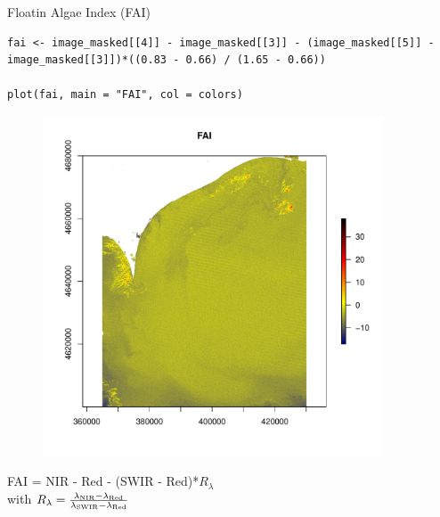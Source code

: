 \documentclass[10pt]{beamer}
\begin{document}
\begin{frame}[fragile]{Floatin Algae Index (FAI)}
\begin{lstlisting}[firstnumber = 49]
fai <- image_masked[[4]] - image_masked[[3]] - (image_masked[[5]] - image_masked[[3]])*((0.83 - 0.66) / (1.65 - 0.66))

plot(fai, main = "FAI", col = colors)
\end{lstlisting}
\begin{minipage}{.6\textwidth}
\begin{figure}
\centering
\includegraphics[width=0.9\textwidth]{images/fai.pdf}
\end{figure}  
\end{minipage}
 \begin{minipage}[b]{.35\textwidth}
\centering
\large FAI = \large NIR - Red - (SWIR - Red)*$R_{\lambda}$ \\
\vspace{0.5cm}
 with $\large R_{\lambda} = \frac{\lambda_{\text{NIR}} - \lambda_{\text{Red}}}{\lambda_{\text{SWIR}} - \lambda_{\text{Red}}}$ 
\end{minipage}
\end{frame}
\end{document}
